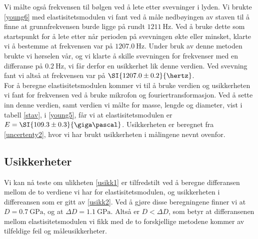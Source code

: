 \documentclass[%
 reprint,
nofootinbib,
aps,
]{revtex4-1}
\begin{document}
Vi målte også frekvensen til bølgen ved å lete etter svevninger i lyden. Vi brukte \eqref{young6} med elastisitetsmodulen vi fant ved å måle nedbøyingen av staven til å finne at grunnfrekvensen burde ligge på rundt $\SI{1211}{\hertz}$. Ved å bruke dette som startspunkt for å lete etter når perioden på svevningen økte eller minsket, klarte vi å bestemme at frekvensen var på $\SI{1207.0}{\hertz}$. Under bruk av denne metoden brukte vi hørselen vår, og vi klarte å skille svevningen for frekvenser med en differanse på $\SI{0.2}{\hertz}$, vi får derfor en usikkerhet lik denne verdien. Ved svevning fant vi altså at frekvensen var på $\SI{1207.0\pm0.2}{\hertz}$.\\
For å beregne elastisitetsmodulen kommer vi til å bruke verdien og usikkerheten vi fant for frekvensen ved å bruke mikrofon og fouriertransformasjon. Ved å sette inn denne verdien, samt verdien vi målte for masse, lengde og diameter, vist i tabell \vref{stav}, i \eqref{young5}, får vi at elastisitetsmodulen er $E = \SI{109.3\pm0.3}{\giga\pascal}$. Usikkerheten er beregnet fra \eqref{uncertenty2}, hvor vi har brukt usikkerheten i målingene nevnt ovenfor.
\subsection{Usikkerheter}
Vi kan nå teste om ulikheten \eqref{usikk1} er tilfredstilt ved å beregne differansen mellom de to verdiene vi har for elastisitetsmodulen, og usikkerheten i differeansen som er gitt av \eqref{usikk2}. Ved å gjøre disse beregningene finner vi at $D = \SI{0.7}{\giga\pascal}$, og at $\Delta D = \SI{1.1}{\giga\pascal}$. Altså er $D<\Delta D$, som betyr at differansenen mellom elastisitetsmodulen vi fikk med de to forskjellige metodene kommer av tilfeldige feil og måleusikkerheter.
\end{document}
